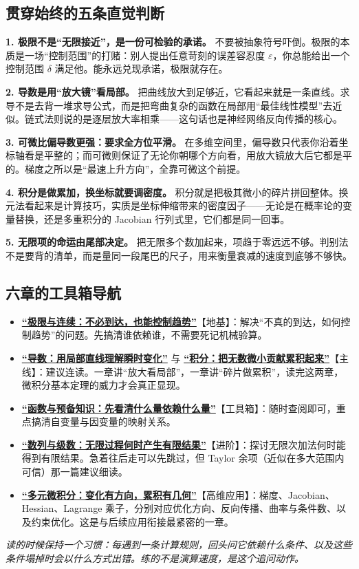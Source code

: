 \subsection*{贯穿始终的五条直觉判断}

\textbf{1. 极限不是“无限接近”，是一份可检验的承诺。}
不要被抽象符号吓倒。极限的本质是一场“控制范围”的打赌：别人提出任意苛刻的误差容忍度 $\varepsilon$，你总能给出一个控制范围 $\delta$ 满足他。能永远兑现承诺，极限就存在。

\textbf{2. 导数是用“放大镜”看局部。}
把曲线放大到足够近，它看起来就是一条直线。求导不是去背一堆求导公式，而是把弯曲复杂的函数在局部用“最佳线性模型”去近似。链式法则说的是逐层放大率相乘——这句话也是神经网络反向传播的核心。

\textbf{3. 可微比偏导数更强：要求全方位平滑。}
在多维空间里，偏导数只代表你沿着坐标轴看是平整的；而可微则保证了无论你朝哪个方向看，用放大镜放大后它都是平的。梯度之所以是“最速上升方向”，全靠可微这个前提。

\textbf{4. 积分是做累加，换坐标就要调密度。}
积分就是把极其微小的碎片拼回整体。换元法看起来是计算技巧，实质是坐标伸缩带来的密度因子——无论是在概率论的变量替换，还是多重积分的 Jacobian 行列式里，它们都是同一回事。

\textbf{5. 无限项的命运由尾部决定。}
把无限多个数加起来，项趋于零远远不够。判别法不是要背的清单，而是量同一段尾巴的尺子，用来衡量衰减的速度到底够不够快。

\subsection*{六章的工具箱导航}

\begin{itemize}
    \item \hyperref[ch:011]{\textbf{“极限与连续：不必到达，也能控制趋势”}}【地基】：解决“不真的到达，如何控制趋势”的问题。先搞清谁依赖谁，不需要死记机械验算。
    \item \hyperref[ch:012]{\textbf{“导数：用局部直线理解瞬时变化”}} 与 \hyperref[ch:013]{\textbf{“积分：把无数微小贡献累积起来”}}【主线】：建议连读。一章讲“放大看局部”，一章讲“碎片做累积”，读完这两章，微积分基本定理的威力才会真正显现。
    \item \hyperref[ch:010]{\textbf{“函数与预备知识：先看清什么量依赖什么量”}}【工具箱】：随时查阅即可，重点搞清自变量与因变量的映射关系。
    \item \hyperref[ch:014]{\textbf{“数列与级数：无限过程何时产生有限结果”}}【进阶】：探讨无限次加法何时能得到有限结果。急着往后走可以先跳过，但 Taylor 余项（近似在多大范围内可信）那一篇建议细读。
    \item \hyperref[ch:015]{\textbf{“多元微积分：变化有方向，累积有几何”}}【高维应用】：梯度、Jacobian、Hessian、Lagrange 乘子，分别对应优化方向、反向传播、曲率与条件数、以及约束优化。这是与后续应用衔接最紧密的一章。
\end{itemize}

\textit{读的时候保持一个习惯：每遇到一条计算规则，回头问它依赖什么条件、以及这些条件塌掉时会以什么方式出错。练的不是演算速度，是这个追问动作。}